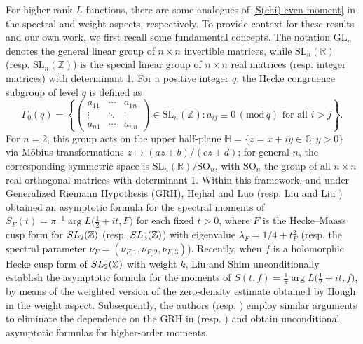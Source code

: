 \documentclass[11pt,reqno]{amsart}
\numberwithin{equation}{section}
\theoremstyle{plain}
\theoremstyle{definition}
\renewcommand{\bmod}[1]{\,(\mathrm{mod\,}{#1})}
\begin{document}
For higher rank $L$-functions, there are some analogues of \eqref{S(chi) even moment} in the spectral and weight aspects, respectively.
To provide context for these results and our own work, we first recall some fundamental concepts.
The notation $\mathrm{GL}_{n}$ denotes the general linear group of $n \times n$ invertible matrices,
while $\mathrm{SL}_{n}(\mathbb{R})$(resp. $\mathrm{SL}_{n}(\mathbb{Z})$) is
the special linear group of $n \times n$ real matrices (resp. integer matrices) with determinant 1. For a positive integer $q$, the Hecke congruence subgroup of level $q$ is defined as
\[
\Gamma_0(q) = \left\{ \begin{pmatrix} a_{11} & \cdots & a_{1n} \\ \vdots & \ddots & \vdots \\ a_{n1} & \cdots & a_{nn} \end{pmatrix} \in \mathrm{SL}_{n}(\mathbb{Z}) : a_{ij} \equiv 0 \bmod q \text{ for all } i>j\right\}.
\]
For $n = 2$, this group acts on the upper half-plane $\mathbb{H} = \{z=x+iy \in \mathbb{C} : y > 0\}$ via M\"obius transformations $z \mapsto (az+b)/(cz+d)$; for general $n$, the corresponding symmetric space is $\mathrm{SL}_{n}(\mathbb{R})/\mathrm{SO}_n$, with $\textrm{SO}_n$ the group of all $n\times n$ real orthogonal matrices with determinant 1.
Within this framework, and under Generalized Riemann Hypothesis (GRH), Hejhal and Luo \cite{HL} (resp. Liu and Liu \cite{LL}) obtained an asymptotic
formula for the spectral moments of $S_F(t)=\pi^{-1}\arg L\big(\frac{1}{2}+it, F\big)$ for each fixed $t>0$, where
$F$ is the Hecke--Maass cusp form for $\rm SL_2(\mathbb{Z})$ (resp. $\rm SL_3(\mathbb{Z})$)
with eigenvalue $\lambda_F=1/4+t_F^2$ (resp. the spectral parameter $\nu_F=(\nu_{F,1}, \nu_{F,2}, \nu_{F,3})$).
Recently, when $f$ is a holomorphic Hecke cusp form of $\rm SL_2(\mathbb{Z})$ with weight $k$,
Liu and Shim \cite{LS} unconditionally establish the asymptotic formula for the moments of
$S(t,f)=\frac{1}{\pi}\arg L\big(\frac{1}{2}+it, f\big)$,
by means of the weighted version of the zero-density estimate obtained by Hough \cite{Hough} in the weight aspect.
Subsequently, the authors \cite{SW} (resp. \cite{SW1}) employ similar
arguments to eliminate the dependence on the GRH in \cite{HL} (resp. \cite{LL})
and obtain unconditional asymptotic formulas for higher-order moments.
\end{document}
